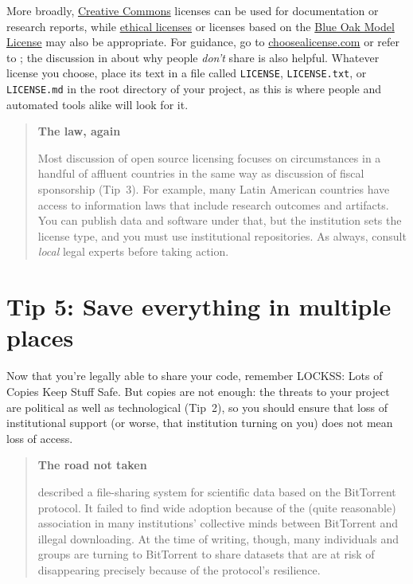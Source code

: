 \documentclass[10pt,letterpaper]{article}
\begin{document}
More broadly,
\href{https://creativecommons.org/}{Creative Commons} licenses can be used for documentation or research reports,
while \href{https://ethicalsource.dev/}{ethical licenses}
or licenses based on the \href{https://blueoakcouncil.org/license/1.0.0}{Blue Oak Model License} may also be appropriate.
For guidance,
go to \href{http://choosealicense.com}{choosealicense.com}
or refer to \cite{Fogel2020,Fortunato2021};
the discussion in \cite{Gomes2022} about why people \emph{don't} share is also helpful.
Whatever license you choose,
place its text in a file called \texttt{LICENSE}, \texttt{LICENSE.txt}, or \texttt{LICENSE.md}
in the root directory of your project,
as this is where people and automated tools alike will look for it.

\begin{quote}
  \noindent
  \textbf{The law, again}

  Most discussion of open source licensing focuses on circumstances in a handful of affluent countries
  in the same way as discussion of fiscal sponsorship (Tip~3).
  For example,
  many Latin American countries have access to information laws that include research outcomes and artifacts.
  You can publish data and software under that,
  but the institution sets the license type,
  and you must use institutional repositories.
  As always,
  consult \emph{local} legal experts before taking action.
\end{quote}

\section*{Tip 5: Save everything in multiple places}

Now that you're legally able to share your code, remember LOCKSS: Lots of Copies Keep Stuff Safe.
But copies are not enough:
the threats to your project are political as well as technological (Tip~2),
so you should ensure that loss of institutional support
(or worse, that institution turning on you)
does not mean loss of access.

\begin{quote}
  \noindent
  \textbf{The road not taken}

  \cite{Langille2010} described a file-sharing system for scientific data
  based on the BitTorrent protocol.
  It failed to find wide adoption because of the (quite reasonable) association in many institutions' collective minds
  between BitTorrent and illegal downloading.
  At the time of writing,
  though,
  many individuals and groups are turning to BitTorrent to share datasets that are at risk of disappearing
  precisely because of the protocol's resilience.
\end{quote}
\end{document}
